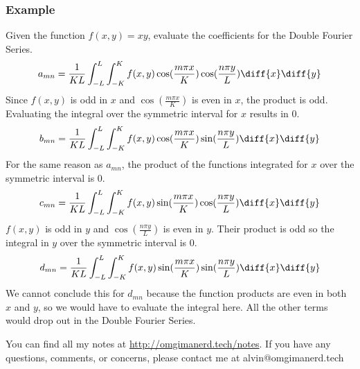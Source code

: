 \documentclass{math}
\begin{document}
\subsubsection*{Example}
Given the function \( f(x,y) = xy \), evaluate the coefficients for the Double
Fourier Series.
\[ a_{mn} = \frac{1}{KL}\int_{-L}^{L}\int_{-K}^{K}f(x,y)\cos(\frac{m\pi x}{K})
  \cos(\frac{n\pi y}{L})\diff{x}\diff{y} \]
Since \( f(x,y) \) is odd in \( x \) and \( \cos(\frac{m\pi x}{K}) \) is even in
\( x \), the product is odd. Evaluating the integral over the symmetric
interval for \( x \) results in 0.
\[ b_{mn} = \frac{1}{KL}\int_{-L}^{L}\int_{-K}^{K}f(x,y)\cos(\frac{m\pi x}{K})
  \sin(\frac{n\pi y}{L})\diff{x}\diff{y} \]
For the same reason as \( a_{mn} \), the product of the functions integrated
for \( x \) over the symmetric interval is 0.
\[ c_{mn} = \frac{1}{KL}\int_{-L}^{L}\int_{-K}^{K}f(x,y)\sin(\frac{m\pi x}{K})
  \cos(\frac{n\pi y}{L})\diff{x}\diff{y} \]
\( f(x,y) \) is odd in \( y \) and \( \cos(\frac{n\pi y}{L}) \) is even in
\( y \). Their product is odd so the integral in \( y \) over the symmetric
interval is 0.
\[ d_{mn} = \frac{1}{KL}\int_{-L}^{L}\int_{-K}^{K}f(x,y)\sin(\frac{m\pi x}{K})
  \sin(\frac{n\pi y}{L})\diff{x}\diff{y} \]
We cannot conclude this for \( d_{mn} \) because the function products are even
in both \( x \) and \( y \), so we would have to evaluate the integral here.
All the other terms would drop out in the Double Fourier Series.

\begin{center}
  You can find all my notes at \url{http://omgimanerd.tech/notes}. If you have
  any questions, comments, or concerns, please contact me at
  alvin@omgimanerd.tech
\end{center}
\end{document}
